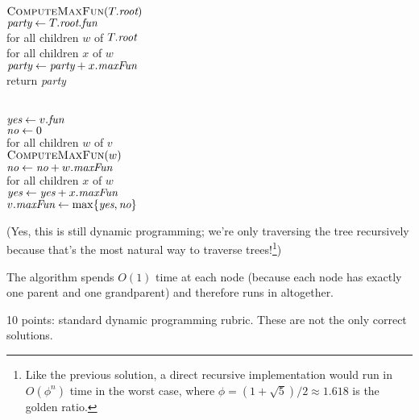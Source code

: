 \documentclass[11pt]{article}
\begin{document}
\begin{enumerate}
\begin{solution}
\begin{center}\small
\begin{algorithm}
	\+
\\	$\textsc{ComputeMaxFun}(T.\emph{root})$
\\	$\emph{party} \gets T.\emph{root}.\emph{fun}$
\\	for all children $w$ of $T.\emph{root}$\+
\\		for all children $x$ of $w$\+
\\			$\emph{party} \gets \emph{party} + x.\emph{maxFun}$\-\-
\\	return \emph{party}
\end{algorithm}
\qquad
\begin{algorithm}
	\+
\\	$\emph{yes} \gets v.\emph{fun}$
\\	$\emph{no} \gets 0$
\\	for all children $w$ of $v$\+
\\		$\textsc{ComputeMaxFun}(w)$
\\		$\emph{no} \gets \emph{no} + w.\emph{maxFun}$
\\		for all children $x$ of $w$\+
\\			$\emph{yes} \gets \emph{yes} + x.\emph{maxFun}$\-\-
\\[0.5ex]
	$v.\emph{maxFun} \gets \max\{ \emph{yes}, \emph{no} \}$
\end{algorithm}
\end{center}
(Yes, this is still dynamic programming; we’re only traversing the tree recursively because that’s the most natural way to traverse trees!\footnote{Like the previous solution, a direct recursive implementation would run in $O(\phi^n)$ time in the worst case, where $\phi = (1+\sqrt{5})/2 \approx 1.618$ is the golden ratio.})

The algorithm spends $O(1)$ time at each node (because each node has exactly one parent and one grandparent) and therefore runs in  altogether.
\end{solution}

\begin{rubric}
10 points: standard dynamic programming rubric.  These are not the only correct solutions.
\end{rubric}

\end{enumerate}
\end{document}
